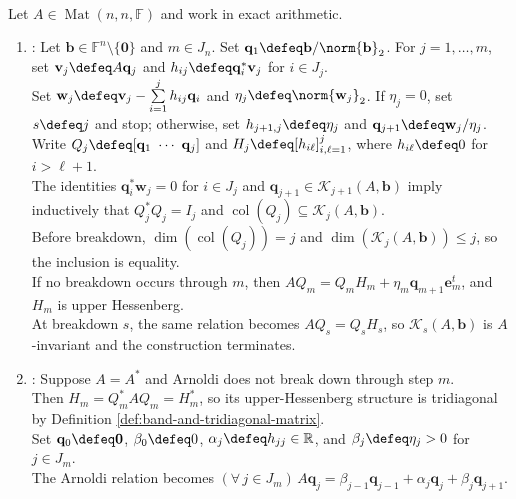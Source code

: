 \begin{computationmethod} \label{meth:arnoldi-lanczos-cg-preview} \\
Let $A\in\operatorname{Mat}(n,n,\mathbb{F})$ and work in exact arithmetic.
\begin{enumerate}[label=(\roman*)]
\setlength{\itemsep}{0pt}
\item {}: Let $\mathbf{b}\in\mathbb{F}^n\setminus\{\mathbf{0}\}$ and $m\in J_n$. Set $\mathbf{q}_1\defeq\mathbf{b}/\norm{\mathbf{b}}_2$. For $j=1,\ldots,m$, set $\mathbf{v}_j\defeq A\mathbf{q}_j$ and $h_{ij}\defeq\mathbf{q}_i^*\mathbf{v}_j$ for $i\in J_j$.\\
Set $\mathbf{w}_j\defeq\mathbf{v}_j-\sum\limits_{i=1}^{j}h_{ij}\mathbf{q}_i$ and $\eta_j\defeq\norm{\mathbf{w}_j}_2$. If $\eta_j=0$, set $s\defeq j$ and stop; otherwise, set $h_{j+1,j}\defeq\eta_j$ and $\mathbf{q}_{j+1}\defeq\mathbf{w}_j/\eta_j$.\\
Write $Q_j\defeq[\mathbf{q}_1\ \cdots\ \mathbf{q}_j]$ and $H_j\defeq[h_{i\ell}]_{i,\ell=1}^{j}$, where $h_{i\ell}\defeq0$ for $i>\ell+1$.\\
The identities $\mathbf{q}_i^*\mathbf{w}_j=0$ for $i\in J_j$ and $\mathbf{q}_{j+1}\in\mathcal{K}_{j+1}(A,\mathbf{b})$ imply inductively that $Q_j^*Q_j=I_j$ and $\operatorname{col}(Q_j)\subseteq\mathcal{K}_j(A,\mathbf{b})$.\\
Before breakdown, $\dim(\operatorname{col}(Q_j))=j$ and $\dim(\mathcal{K}_j(A,\mathbf{b}))\leq j$, so the inclusion is equality.\\
If no breakdown occurs through $m$, then $AQ_m=Q_mH_m+\eta_m\mathbf{q}_{m+1}\mathbf{e}_m^t$, and $H_m$ is upper Hessenberg.\\
At breakdown $s$, the same relation becomes $AQ_s=Q_sH_s$, so $\mathcal{K}_s(A,\mathbf{b})$ is $A$-invariant and the construction terminates.
\item {}: Suppose $A=A^*$ and Arnoldi does not break down through step $m$.\\
Then $H_m=Q_m^*AQ_m=H_m^*$, so its upper-Hessenberg structure is tridiagonal by Definition \ref{def:band-and-tridiagonal-matrix}.\\
Set $\mathbf{q}_0\defeq\mathbf{0}$, $\beta_0\defeq0$, $\alpha_j\defeq h_{jj}\in\mathbb{R}$, and $\beta_j\defeq\eta_j>0$ for $j\in J_m$.\\
The Arnoldi relation becomes $(\forall\,j\in J_m)\,A\mathbf{q}_j=\beta_{j-1}\mathbf{q}_{j-1}+\alpha_j\mathbf{q}_j+\beta_j\mathbf{q}_{j+1}$.\\

\end{enumerate}
\end{computationmethod}

